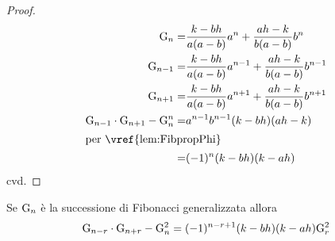 \begin{proof}
\begin{align*}
\Gib{n}=&{}\dfrac{k-bh}{a(a-b)}a^n+\dfrac{ah-k}{b(a-b)}b^n\\
\Gib{n-1}=&{}\dfrac{k-bh}{a(a-b)}a^{n-1}+\dfrac{ah-k}{b(a-b)}b^{n-1}\\
\Gib{n+1}=&{}\dfrac{k-bh}{a(a-b)}a^{n+1}+\dfrac{ah-k}{b(a-b)}b^{n+1}\\
\Gib{n-1}\cdot\Gib{n+1}-\Gib{n}^n=&a^{n-1}b^{n-1}(k-bh)(ah-k)\\
	\intertext{per~\vref{lem:FibpropPhi}}
	=&(-1)^{n}(k-bh)(k-ah)\\
\end{align*}
cvd.
\end{proof}
\begin{thm}\label{thm:fibCatalanGen}
	Se $\mathrm{G}_{n}$ è la successione di Fibonacci generalizzata allora 
	\begin{equation}
		\mathrm{G}_{n-r}\cdot\mathrm{G}_{n+r}-\mathrm{G}_{n}^2=(-1)^{n-r+1}(k-bh)(k-ah)\mathrm{G}_{r}^2
	\end{equation}\label{eqn:fibCatalanGen}
\end{thm}
